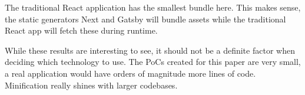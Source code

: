 The traditional React application has the smallest bundle here. 
This makes sense, the static generators Next and Gatsby will bundle assets while the traditional React app will fetch these during runtime.

While these results are interesting to see, it should not be a definite factor when deciding which technology to use.
The PoCs created for this paper are very small, a real application would have orders of magnitude more lines of code.
Minification really shines with larger codebases. 